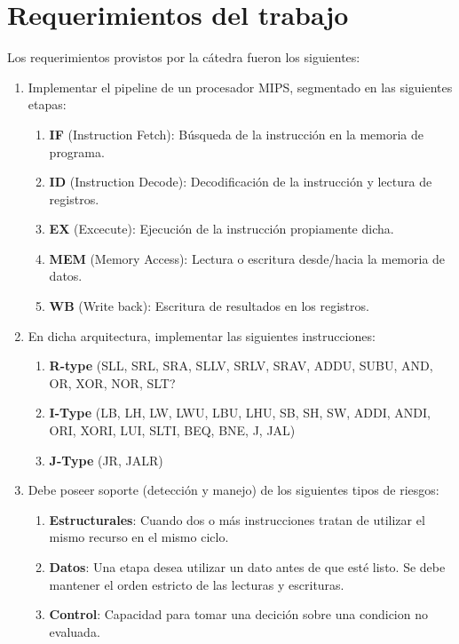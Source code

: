 \documentclass[12pt]{article}
\begin{document}
\section{Requerimientos del trabajo}\label{sec:consigna}

Los requerimientos provistos por la cátedra fueron los siguientes:

\begin{enumerate}
  \item Implementar el pipeline de un procesador MIPS, segmentado en las siguientes etapas:
  \begin{enumerate}
    \item \textbf{IF} (Instruction Fetch): Búsqueda de la instrucción en la memoria de programa.
    \item \textbf{ID} (Instruction Decode): Decodificación de la instrucción y lectura de registros.
    \item \textbf{EX} (Excecute): Ejecución de la instrucción propiamente dicha.
    \item \textbf{MEM} (Memory Access): Lectura o escritura desde/hacia la memoria de datos.
    \item \textbf{WB} (Write back): Escritura de resultados en los registros.
  \end{enumerate}
  \item En dicha arquitectura, implementar las siguientes instrucciones:
  \begin{enumerate}
    \item \textbf{R-type} (SLL, SRL, SRA, SLLV, SRLV, SRAV, ADDU, SUBU, AND, OR, XOR, NOR, SLT?
    \item \textbf{I-Type} (LB, LH, LW, LWU, LBU, LHU, SB, SH, SW, ADDI, ANDI, ORI, XORI, LUI, SLTI, BEQ, BNE, J, JAL)
    \item \textbf{J-Type} (JR, JALR)
  \end{enumerate}
  \item Debe poseer soporte (detección y manejo) de los siguientes tipos de riesgos:
  \begin{enumerate}
    \item \textbf{Estructurales}: Cuando dos o más instrucciones tratan de utilizar el mismo recurso en el mismo ciclo.
    \item \textbf{Datos}: Una etapa desea utilizar un dato antes de que esté listo. Se debe mantener el orden estricto de las lecturas y escrituras. 
    \item \textbf{Control}: Capacidad para tomar una decición sobre una condicion no evaluada. \\

\end{enumerate}
\end{enumerate}
\end{document}

